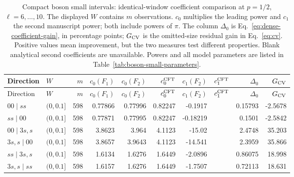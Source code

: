 \begingroup\setlength{\tabcolsep}{2pt}
\begin{longtable}{llrrrrrrrr}
\caption{Compact boson small intervals: identical-window coefficient comparison at $p=1/2$, $\ell=6,\ldots,10$. The displayed $W$ contains $m$ observations. $c_0$ multiplies the leading power and $c_1$ the second manuscript power; both include powers of $\pi$. The column $\Delta_0$ is Eq.~\eqref{eq:dense-coefficient-gain}, in percentage points; $G_{\rm CV}$ is the omitted-size residual gain in Eq.~\eqref{eq:cv}. Positive values mean improvement, but the two measures test different properties. Blank analytical second coefficients are unavailable. Powers and all model parameters are listed in Table~\ref{tab:boson-small-parameters}.}
\label{tab:dense-small-boson}\\\toprule
Direction & $W$ & $m$ & $c_0(F_1)$ & $c_0(F_2)$ & $c_0^{\rm CFT}$ & $c_1(F_2)$ & $c_1^{\rm CFT}$ & $\Delta_0$ & $G_{\rm CV}$\\\midrule
\endfirsthead
\toprule
Direction & $W$ & $m$ & $c_0(F_1)$ & $c_0(F_2)$ & $c_0^{\rm CFT}$ & $c_1(F_2)$ & $c_1^{\rm CFT}$ & $\Delta_0$ & $G_{\rm CV}$\\\midrule
\endhead
\bottomrule\endfoot
$00\mid ss$ & $(0,0.1]$ & 598 & 0.77866 & 0.77996 & 0.82247 & -0.1917 &  & 0.15793 & -2.5678\\
$ss\mid 00$ & $(0,0.1]$ & 598 & 0.77871 & 0.77995 & 0.82247 & -0.18219 &  & 0.1501 & -2.5842\\
$00\mid 3s,s$ & $(0,0.1]$ & 598 & 3.8623 & 3.964 & 4.1123 & -15.02 &  & 2.4748 & 35.203\\
$3s,s\mid 00$ & $(0,0.1]$ & 598 & 3.8657 & 3.9643 & 4.1123 & -14.541 &  & 2.3959 & 35.866\\
$ss\mid 3s,s$ & $(0,0.1]$ & 598 & 1.6134 & 1.6276 & 1.6449 & -2.0896 &  & 0.86075 & 18.998\\
$3s,s\mid ss$ & $(0,0.1]$ & 598 & 1.6157 & 1.6276 & 1.6449 & -1.7507 &  & 0.72113 & 18.631\\
\end{longtable}
\endgroup
